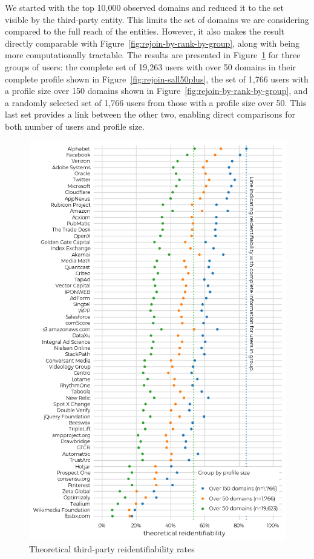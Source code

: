 \documentclass[letterpaper,twocolumn,10pt]{article}
\begin{document}
We started with the top 10,000 observed domains and reduced it to the set visible by the third-party entity.
This limits the set of domains we are considering compared to the full reach of the entities. 
However, it also makes the result directly comparable with Figure~\ref{fig:rejoin-by-rank-by-group}, along with being more computationally tractable.
The results are presented in Figure~\ref{fig:rejoin-webiverses} for three groups of users: the complete set of 19,263 users with over 50 domains in their complete profile shown in Figure~\ref{fig:rejoin-sall50plus}, the set of 1,766 users with a profile size over 150 domains shown in Figure~\ref{fig:rejoin-by-rank-by-group}, and a randomly selected set of 1,766 users from those with a profile size over 50. 
This last set provides a link between the other two, enabling direct comparisons for both number of users and profile size.
%
\begin{figure}[ht]
    \centering
    \includegraphics[width=0.9\linewidth]{figures/4-e2-webiverses.png}
    \caption{Theoretical third-party reidentifiability rates}
    \label{fig:rejoin-webiverses}
\end{figure}
\end{document}
